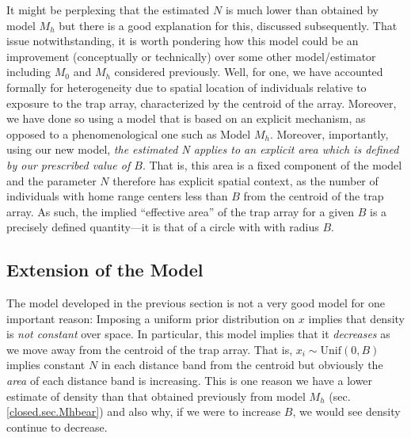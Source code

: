 It might be
perplexing that the estimated $N$ is much lower than obtained by model
$M_h$ but there is a good explanation for this, discussed
subsequently. That issue notwithstanding, it is worth pondering how
this model could be an improvement (conceptually or technically) over
some other model/estimator including $M_0$ and $M_h$ considered
previously. Well, for one, we have accounted formally for
heterogeneity due to spatial location of individuals relative to
exposure to the trap array, characterized by the centroid of the
array. Moreover, we have done so using a model that is based on an
explicit mechanism, as opposed to a phenomenological one such as Model
$M_h$. Moreover, importantly, using our new model, {\it the estimated N
  applies to an explicit area which is defined by our prescribed value
  of $B$}. That is, this area is a fixed component of the model and
the parameter $N$ therefore has explicit spatial context, as the number
of individuals with home range centers less than $B$ from the
centroid of the trap array. As such, the implied ``effective
area'' of the trap array for a given $B$ is a precisely defined
quantity---it is that of a circle with with radius
$B$.


\subsection{Extension of the Model}

The model developed in the previous section
 is  not a very good model for one important reason:
Imposing a uniform prior distribution on $x$ implies that density is
{\it not constant} over space. In particular, this model implies that
it {\it decreases} as we move away from the centroid of the trap
array.  That is, $x_{i} \sim \mbox{Unif}(0,B)$ implies constant
$N$ in each distance band from the centroid but obviously the {\it
  area} of each distance band is increasing.  This is one reason we
have a lower estimate of density than that obtained previously from
model $M_h$ (sec. \ref{closed.sec.Mhbear})
and also why, if we were to increase $B$, we would
see density continue to decrease.

